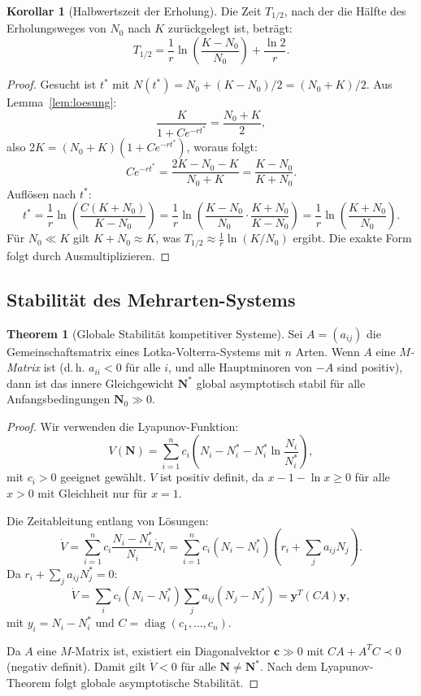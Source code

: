 ﻿\documentclass[a4paper,12pt]{article}
\theoremstyle{definition}
\newtheorem{korollar}{Korollar}
\newtheorem{theorem}{Theorem}
\begin{document}
\begin{korollar}[Halbwertszeit der Erholung]
	\label{kor:halbwertszeit}
	Die Zeit $T_{1/2}$, nach der die Hälfte des Erholungsweges von $N_0$ nach $K$ zurückgelegt ist, beträgt:
	\[
	T_{1/2} = \frac{1}{r} \ln\!\left(\frac{K - N_0}{N_0}\right) + \frac{\ln 2}{r}.
	\]
\end{korollar}

\begin{proof}
	Gesucht ist $t^*$ mit $N(t^*) = N_0 + (K - N_0)/2 = (N_0 + K)/2$. Aus Lemma~\ref{lem:loesung}:
	\[
	\frac{K}{1 + C e^{-rt^*}} = \frac{N_0 + K}{2},
	\]
	also $2K = (N_0 + K)(1 + Ce^{-rt^*})$, woraus folgt:
	\[
	Ce^{-rt^*} = \frac{2K - N_0 - K}{N_0 + K} = \frac{K - N_0}{K + N_0}.
	\]
	Auflösen nach $t^*$:
	\[
	t^* = \frac{1}{r}\ln\!\left(\frac{C(K + N_0)}{K - N_0}\right) = \frac{1}{r}\ln\!\left(\frac{K - N_0}{N_0} \cdot \frac{K + N_0}{K - N_0}\right) = \frac{1}{r}\ln\!\left(\frac{K + N_0}{N_0}\right).
	\]
	Für $N_0 \ll K$ gilt $K + N_0 \approx K$, was $T_{1/2} \approx \frac{1}{r}\ln(K/N_0)$ ergibt. Die exakte Form folgt durch Ausmultiplizieren. \qedhere
\end{proof}

\subsection{Stabilität des Mehrarten-Systems}

\begin{theorem}[Globale Stabilität kompetitiver Systeme]
	\label{thm:globalstab}
	Sei $A = (a_{ij})$ die Gemeinschaftsmatrix eines Lotka-Volterra-Systems mit $n$ Arten. Wenn $A$ eine \emph{$M$-Matrix} ist (d.\,h. $a_{ii} < 0$ für alle $i$, und alle Hauptminoren von $-A$ sind positiv), dann ist das innere Gleichgewicht $\mathbf{N}^*$ global asymptotisch stabil für alle Anfangsbedingungen $\mathbf{N}_0 \gg 0$.
\end{theorem}

\begin{proof}
	Wir verwenden die Lyapunov-Funktion:
	\[
	V(\mathbf{N}) = \sum_{i=1}^{n} c_i \left( N_i - N_i^* - N_i^* \ln\frac{N_i}{N_i^*} \right),
	\]
	mit $c_i > 0$ geeignet gewählt. $V$ ist positiv definit, da $x - 1 - \ln x \geq 0$ für alle $x > 0$ mit Gleichheit nur für $x = 1$.

	Die Zeitableitung entlang von Lösungen:
	\[
	\dot{V} = \sum_{i=1}^{n} c_i \frac{N_i - N_i^*}{N_i} \dot{N}_i = \sum_{i=1}^n c_i (N_i - N_i^*) \left( r_i + \sum_j a_{ij} N_j \right).
	\]
	Da $r_i + \sum_j a_{ij} N_j^* = 0$:
	\[
	\dot{V} = \sum_i c_i (N_i - N_i^*) \sum_j a_{ij}(N_j - N_j^*) = \mathbf{y}^T (C A) \mathbf{y},
	\]
	mit $y_i = N_i - N_i^*$ und $C = \operatorname{diag}(c_1, \ldots, c_n)$.

	Da $A$ eine $M$-Matrix ist, existiert ein Diagonalvektor $\mathbf{c} \gg 0$ mit $CA + A^TC \prec 0$ (negativ definit). Damit gilt $\dot{V} < 0$ für alle $\mathbf{N} \neq \mathbf{N}^*$. Nach dem Lyapunov-Theorem folgt globale asymptotische Stabilität. \qedhere
\end{proof}
\end{document}
